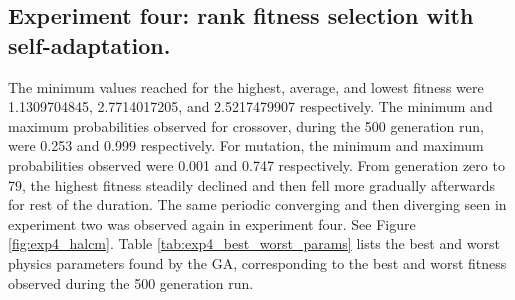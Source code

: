 

\newpage

\subsection[Experiment Four]{Experiment four: rank fitness selection with self-adaptation.}

The minimum values reached for the highest, average, and lowest fitness were 1.1309704845, 2.7714017205, and 2.5217479907 respectively. The minimum and maximum probabilities observed for crossover, during the 500 generation run, were 0.253 and 0.999 respectively. For mutation, the minimum and maximum probabilities observed were 0.001 and 0.747 respectively. From generation zero to 79, the highest fitness steadily declined and then fell more gradually afterwards for rest of the duration. The same periodic converging and then diverging seen in experiment two was observed again in experiment four. See Figure \ref{fig:exp4_halcm}. Table \ref{tab:exp4_best_worst_params} lists the best and worst physics parameters found by the GA, corresponding to the best and worst fitness observed during the 500 generation run.

